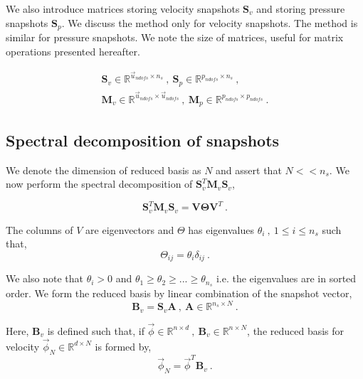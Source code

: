 \documentclass[graybox]{svmult}
\begin{document}
We also introduce matrices storing velocity snapshots $\bm{S}_v$ and storing pressure snapshots $\bm{S}_p$. We discuss the method only for velocity snapshots. The method is similar for pressure snapshots. We note the size of matrices, useful for matrix operations presented hereafter.

\begin{gather*}
\bm{S}_v \in \mathbb{R}^{\overrightarrow{u}_{ndofs} \times n_s} \ , \ \bm{S}_p \in \mathbb{R}^{p_{ndofs} \times n_s} \ , \\
\bm{M}_v \in \mathbb{R}^{\overrightarrow{u}_{ndofs} \times \overrightarrow{u}_{ndofs}} \ ,\ \bm{M}_p \in \mathbb{R}^{p_{ndofs} \times p_{ndofs}} \ .
\end{gather*}

\subsection{Spectral decomposition of snapshots}\label{spectral_decomposition_section}

We denote the dimension of reduced basis as $N$ and assert that $N << n_s$. We now perform the spectral decomposition of $\bm{S}_v^T \bm{M}_v \bm{S}_v$,

\begin{equation}
\bm{S}_v^T \bm{M}_v \bm{S}_v = \bm{V} \bm{\Theta} \bm{V}^T \ .
\end{equation}

The columns of $V$ are eigenvectors and $\Theta$ has eigenvalues $\theta_i \ , \ 1 \leq i \leq n_s$ such that,
\begin{equation}
\Theta_{ij} = \theta_i \delta_{ij} \ .
\end{equation}

We also note that $\theta_i > 0$ and $\theta_1 \geq \theta_2 \geq ... \geq \theta_{n_s}$ i.e. the eigenvalues are in sorted order. We form the reduced basis by linear combination of the snapshot vector,
\begin{equation}
\bm{B}_v = \bm{S}_v \bm{A} \ , \ \bm{A} \in \mathbb{R}^{n_s \times N} \ .
\end{equation}

Here, $\bm{B}_v$ is defined such that, if $\overrightarrow{\phi} \in \mathbb{R}^{n \times d} \ , \ \bm{B}_v \in \mathbb{R}^{n \times N}$, the reduced basis for velocity $\overrightarrow{\phi}_N \in \mathbb{R}^{d \times N}$ is formed by,
\begin{equation}
\overrightarrow{\phi}_N = \overrightarrow{\phi}^T \bm{B}_v \ .
\end{equation}
\end{document}
